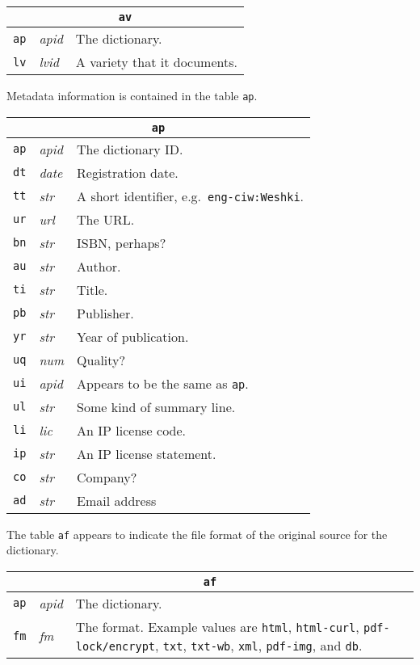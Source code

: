 \begin{trivlist}\item
\begin{tabular}{|llp{3.5in}|}
\hline
\multicolumn{3}{|c|}{\tt av}\\
\hline
{\tt ap} & {\it apid} & The dictionary.\\
{\tt lv} & {\it lvid} & A variety that it documents.\\
\hline
\end{tabular}
\end{trivlist}
Metadata information is contained in the table {\tt ap}.
\begin{trivlist}\item
\begin{tabular}{|llp{3.5in}|}
\hline
\multicolumn{3}{|c|}{\tt ap}\\
\hline
{\tt ap} & {\it apid} & The dictionary ID.\\
{\tt dt} & {\it date} & Registration date.\\
{\tt tt} & {\it str}  & A short identifier, e.g.\ {\tt eng-ciw:Weshki}.\\
{\tt ur} & {\it url}  & The URL.\\
{\tt bn} & {\it str}  & ISBN, perhaps?\\
{\tt au} & {\it str}  & Author.\\
{\tt ti} & {\it str}  & Title.\\
{\tt pb} & {\it str}  & Publisher.\\
{\tt yr} & {\it str}  & Year of publication.\\
{\tt uq} & {\it num}  & Quality?\\
{\tt ui} & {\it apid} & Appears to be the same as {\tt ap}.\\
{\tt ul} & {\it str}  & Some kind of summary line.\\
{\tt li} & {\it lic}  & An IP license code.\\
{\tt ip} & {\it str}  & An IP license statement.\\
{\tt co} & {\it str}  & Company?\\
{\tt ad} & {\it str}  & Email address\\
\hline
\end{tabular}
\end{trivlist}
The table {\tt af} appears to indicate the file format of the original
source for the dictionary.
\begin{trivlist}\item
\begin{tabular}{|llp{3.5in}|}
\hline
\multicolumn{3}{|c|}{\tt af}\\
\hline
{\tt ap} & {\it apid} & The dictionary.\\
{\tt fm} & {\it fm} & The format.  Example values are {\tt html},
    {\tt html-curl}, {\tt pdf-lock/encrypt}, {\tt txt}, {\tt txt-wb},
    {\tt xml}, {\tt pdf-img}, and {\tt db}.
\\
\hline
\end{tabular}
\end{trivlist}
